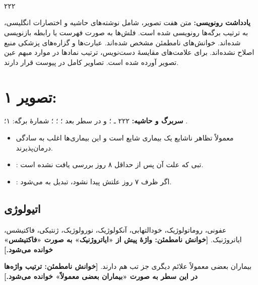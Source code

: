 \documentclass[12pt,a4paper]{article}
\begin{document}
\fi
\providecommand{\FUOunclear}[1]{\textbf{[خوانش نامطمئن: #1]}}
\providecommand{\FUOmath}[1]{\lr{\(#1\)}}
\providecommand{\FUOpage}[2]{\clearpage\section*{تصویر #1: \lr{\texttt{pic#2.jpg}}}}
\providecommand{\FUOheader}[1]{\textbf{سربرگ و حاشیه:} ۲۲۲ ـ \lr{FUO}؛
  \lr{Subject:} (خالی)؛ \lr{Date: / /}؛ شمارهٔ برگه: #1؛ نشان پایین برگه: \lr{YASHA}.\par}

\begin{center}
{\Large\bfseries {}}\\
\\
\\
۲۲۲
\end{center}
\textbf{یادداشت رونویسی:} متن هفت تصویر، شامل نوشته‌های حاشیه و اختصارات انگلیسی، به ترتیب برگه‌ها رونویسی شده است. فلش‌ها به صورت فهرست یا رابطه بازنویسی شده‌اند. خوانش‌های نامطمئن مشخص شده‌اند. عبارت‌ها و گزاره‌های پزشکی منبع اصلاح نشده‌اند. برای علامت‌های مقایسهٔ دست‌نویس، ترتیب نمادها در موارد مبهم عین تصویر آورده شده است. تصاویر کامل در پیوست قرار دارند.

\FUOpage{۱}{01}
\textbf{سربرگ و حاشیه:} ۲۲۲ ـ ؛  و در سطر بعد ؛
؛ ؛ شمارهٔ برگه: ۱؛ .

\begin{itemize}
\item {} معمولاً تظاهر ناشایع یک بیماری شایع است و این بیماری‌ها اغلب به سادگی درمان‌پذیرند.
\item {}: تبی که علت آن پس از حداقل ۸ روز بررسی یافت نشده است.
\item {}: اگر ظرف ۷ روز علتش پیدا نشود، تبدیل به  می‌شود.
\end{itemize}

\subsection*{اتیولوژی }
عفونی، روماتولوژیک، خودالتهابی، آنکولوژیک، نورولوژیک، ژنتیکی، فاکتیشس، ایاتروژنیک.
\FUOunclear{واژهٔ پیش از «ایاتروژنیک» به صورت «فاکتیشس» خوانده می‌شود.}

بیماران بعضی معمولاً علائم دیگری جز تب هم دارند.
\FUOunclear{ترتیب واژه‌ها در این سطر به صورت «بیماران بعضی معمولاً» خوانده می‌شود.}
\end{document}
